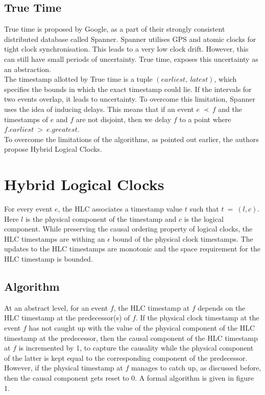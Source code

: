 \documentclass{article}
\begin{document}
    \subsection{True Time}

    True time is proposed by Google, as a part of their strongly consistent distributed database called Spanner\cite{spanner}. Spanner utilises GPS and atomic clocks for tight clock synchronisation. This leads to a very low clock drift. However, this can still have small periods of uncertainty. True time, exposes this uncertainty as an abstraction. \\

    The timestamp allotted by True time is a tuple $(earliest,\ latest)$, which specifies the bounds in which the exact timestamp could lie. If the intervals for two events overlap, it leads to uncertainty. To overcome this limitation, Spanner uses the idea of inducing delays. This means that if an event $e\ \prec\ f$ and the timestamps of $e$ and $f$ are not disjoint, then we delay $f$ to a point where $f.earliest\ >\ e.greatest$. \\

    To overcome the limitations of the algorithms, as pointed out earlier, the authors propose Hybrid Logical Clocks.

    \section{Hybrid Logical Clocks}

    For every event $e$, the HLC associates a timestamp value $t$ such that $t\ =\ (l,c)$. Here $l$ is the physical component of the timestamp and $c$ is the logical component. While preserving the causal ordering property of logical clocks, the HLC timestamps are withing an $\epsilon$ bound of the physical clock timestamps. The updates to the HLC timestamps are monotonic and the space requirement for the HLC timestamp is bounded.

    \subsection{Algorithm}

    At an abstract level, for an event $f$, the HLC timestamp at $f$ depends on the HLC timestamp at the predecessor(s) of $f$. If the physical clock timestamp at the event $f$ has not caught up with the value of the physical component of the HLC timestamp at the predecessor, then the causal component of the HLC timestamp at $f$ is incremented by 1, to capture the causality while the physical component of the latter is kept equal to the corresponding component of the predecessor. However, if the physical timestamp at $f$ manages to catch up, as discussed before, then the causal component gets reset to 0. A formal algorithm is given in figure 1. 
\end{document}

